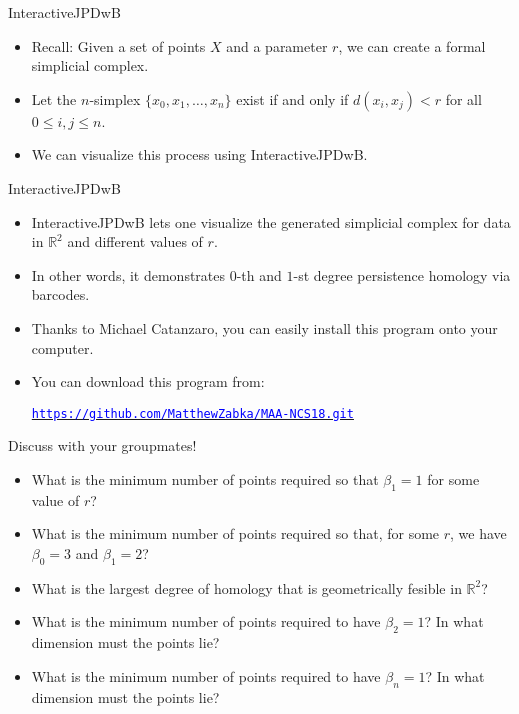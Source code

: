 \begin{frame}{InteractiveJPDwB}
\begin{itemize}
\item<1-> Recall: Given a set of points $X$ and a parameter $r$, we can create a formal simplicial complex.
\item<2-> Let the $n$-simplex $\{x_0, x_1, \ldots, x_n\}$ exist if and only if $d(x_i, x_j) < r$ for all $0 \leq i,j\leq n$. 
\item<3-> We can visualize this process using InteractiveJPDwB.
\end{itemize}
\end{frame}

\begin{frame}{InteractiveJPDwB}
\begin{itemize}
\item<1-> InteractiveJPDwB \cite{Wolcott2016InteractiveJPDwB} lets one visualize the generated simplicial complex for data in $\mathbb{R}^2$ and different values of $r$.
\item<2-> In other words, it demonstrates $0$-th and $1$-st degree persistence homology via barcodes.
\item<2-> Thanks to Michael Catanzaro, you can easily install this program onto your computer.
\item<3-> You can download this program from:
\begin{center}
\hyperref[https://github.com/MatthewZabka/MAA-NCS18.git]{\textcolor{blue}{\texttt{https://github.com/MatthewZabka/MAA-NCS18.git}}}
\end{center}
\end{itemize}
\end{frame}
\begin{frame}{Discuss with your groupmates!}
\begin{itemize}
\item What is the minimum number of points required so that $\beta_1 = 1$ for some value of $r$?
\item What is the minimum number of points required so that, for some $r$, we have $\beta_0 = 3$ and $\beta_1 = 2$?
\item What is the largest degree of homology that is geometrically fesible in $\mathbb{R}^2$?
\item What is the minimum number of points required to have $\beta_2 = 1$? In what dimension must the points lie?
\item What is the minimum number of points required to have $\beta_n = 1$?  In what dimension must the points lie?
\end{itemize}
\end{frame}

